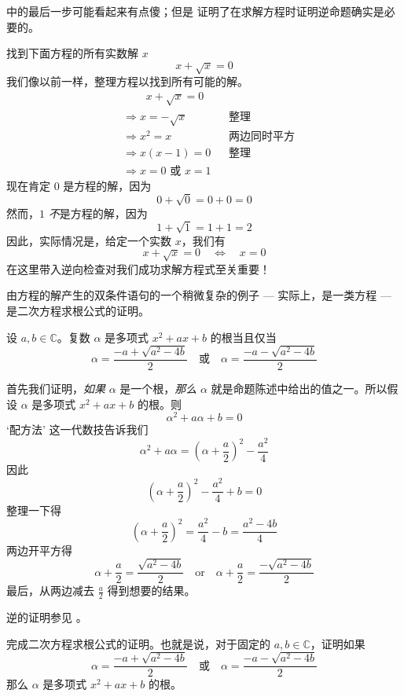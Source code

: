 中的最后一步可能看起来有点傻；但是  证明了在求解方程时证明逆命题确实是必要的。

\begin{example}
\label{exSolveSqrtSecondExample}
找到下面方程的所有实数解 $x$
\[
x+\sqrt{x}=0
\]
我们像以前一样，整理方程以找到所有可能的解。
\begin{align*}
&\phantom{\Rightarrow\;\;} x+\sqrt{x} = 0 && \\
&\Rightarrow x=-\sqrt{x} && \text{整理} \\
&\Rightarrow x^2=x && \text{两边同时平方} \\
&\Rightarrow x(x-1)=0 && \text{整理} \\
&\Rightarrow x=0 \text{ 或 } x=1 && 
\end{align*}
现在肯定 $0$ 是方程的解，因为
\[
0+\sqrt{0} = 0+0 = 0
\]
然而，$1$ \textit{不}是方程的解，因为
\[
1+\sqrt{1} = 1+1 = 2
\]
因此，实际情况是，给定一个实数 $x$，我们有
\[
x+\sqrt{x} = 0 \quad \Leftrightarrow \quad x=0
\]
在这里带入逆向检查对我们成功求解方程式至关重要！
\end{example}

由方程的解产生的双条件语句的一个稍微复杂的例子 --- 实际上，是一类方程 --- 是二次方程求根公式的证明。

\begin{itheorem}[二次方程求根公式]
\label{thmQuadraticFormula}
设 $a,b \in \mathbb{C}$。复数 $\alpha$ 是多项式 $x^2+ax+b$ 的根当且仅当
\[
\alpha = \frac{-a+\sqrt{a^2-4b}}{2} \quad \text{或} \quad \alpha =\frac{-a-\sqrt{a^2-4b}}{2}
\]
\end{itheorem}

\begin{cproof}
首先我们证明，\textit{如果} $\alpha$ 是一个根，\textit{那么} $\alpha$ 就是命题陈述中给出的值之一。所以假设 $\alpha$ 是多项式 $x^2+ax+b$ 的根。则
\[
\alpha^2 + a\alpha + b = 0
\]
`配方法' 这一代数技告诉我们
\[
\alpha^2 + a\alpha = \left( \alpha + \frac{a}{2} \right)^2 - \frac{a^2}{4}
\]
因此
\[
\left( \alpha + \frac{a}{2} \right)^2 - \frac{a^2}{4} + b = 0
\]
整理一下得
\[
\left( \alpha + \frac{a}{2} \right)^2  = \frac{a^2}{4} - b = \frac{a^2-4b}{4}
\]
两边开平方得
\[
\alpha + \frac{a}{2} = \frac{\sqrt{a^2-4b}}{2} \quad \text{or} \quad \alpha + \frac{a}{2} = \frac{-\sqrt{a^2-4b}}{2}
\]
最后，从两边减去 $\frac{a}{2}$ 得到想要的结果。

逆的证明参见 。
\end{cproof}

\begin{exercise}
\label{exQuadraticFormulaConverse}
完成二次方程求根公式的证明。也就是说，对于固定的 $a,b \in \mathbb{C}$，证明如果 
\[
\alpha = \frac{-a+\sqrt{a^2-4b}}{2} \quad \text{或} \quad \alpha =\frac{-a-\sqrt{a^2-4b}}{2}
\]
那么 $\alpha$ 是多项式 $x^2+ax+b$ 的根。
\end{exercise}

